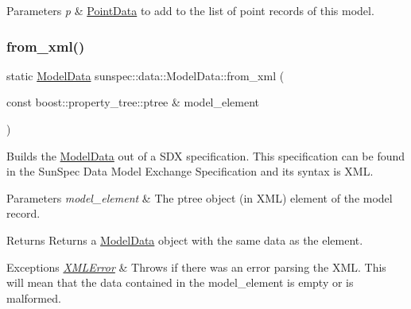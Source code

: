 \begin{DoxyParams}{Parameters}
{\em p} & {\ttfamily \hyperlink{structsunspec_1_1data_1_1_point_data}{Point\+Data}} to add to the list of point records of this model. \\
\hline
\end{DoxyParams}
\mbox{\label{structsunspec_1_1data_1_1_model_data_a8a57a3b29c57f7340ce3c89da6764e78}} 
\subsubsection{\texorpdfstring{from\+\_\+xml()}{from\_xml()}\hspace{0.1cm}{\footnotesize\ttfamily [1/2]}}
{\footnotesize\ttfamily static \hyperlink{structsunspec_1_1data_1_1_model_data}{Model\+Data} sunspec\+::data\+::\+Model\+Data\+::from\+\_\+xml (\begin{DoxyParamCaption}\item[{const boost\+::property\+\_\+tree\+::ptree \&}]{model\+\_\+element }\end{DoxyParamCaption})\hspace{0.3cm}{\ttfamily [static]}}

Builds the \hyperlink{structsunspec_1_1data_1_1_model_data}{Model\+Data} out of a S\+DX specification. This specification can be found in the Sun\+Spec Data Model Exchange Specification and its syntax is X\+ML. 
\begin{DoxyParams}{Parameters}
{\em model\+\_\+element} & The {\ttfamily ptree} object (in X\+ML) element of the model record. \\
\hline
\end{DoxyParams}
\begin{DoxyReturn}{Returns}
Returns a {\ttfamily \hyperlink{structsunspec_1_1data_1_1_model_data}{Model\+Data}} object with the same data as the element. 
\end{DoxyReturn}

\begin{DoxyExceptions}{Exceptions}
{\em \hyperlink{classsunspec_1_1data_1_1_x_m_l_error}{X\+M\+L\+Error}} & Throws if there was an error parsing the X\+ML. This will mean that the data contained in the {\ttfamily model\+\_\+element} is empty or is malformed. \\
\hline
\end{DoxyExceptions}
\mbox{\label{structsunspec_1_1data_1_1_model_data_a641f3aa787ba842f6a7b782af694de63}} 
